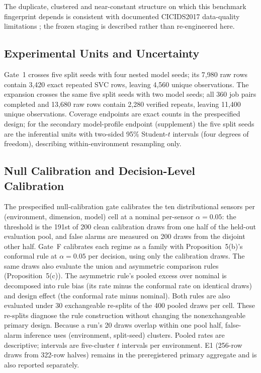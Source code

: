 \documentclass[10pt,journal,compsoc]{IEEEtran}
\begin{document}
The duplicate, clustered and near-constant structure on which this benchmark
fingerprint depends is consistent with documented CICIDS2017 data-quality
limitations \cite{Engelen2021}; the frozen staging is described rather than
re-engineered here.

\subsection{Experimental Units and Uncertainty}

Gate~1 crosses five split seeds with four nested model seeds; its 7,980 raw
rows contain 3,420 exact repeated SVC rows, leaving 4,560 unique observations.
The expansion crosses the same five split seeds with two model seeds; all 360
job pairs completed and 13,680 raw rows contain 2,280 verified repeats,
leaving 11,400 unique observations. Coverage endpoints are exact counts in the
prespecified design; for the secondary model-profile endpoint (supplement) the
five split seeds are the inferential units with two-sided 95\% Student-$t$
intervals (four degrees of freedom), describing within-environment resampling
only.

\subsection{Null Calibration and Decision-Level Calibration}

The prespecified null-calibration gate calibrates the ten distributional
sensors per (environment, dimension, model) cell at a nominal per-sensor
$\alpha=0.05$: the threshold is the 191st of 200 clean calibration draws from
one half of the held-out evaluation pool, and false alarms are measured on
200 draws from the disjoint other half. Gate~F calibrates each regime as a
family with Proposition~5(b)'s conformal rule at $\alpha=0.05$ per decision,
using only the calibration draws. The same draws also evaluate the union and
asymmetric comparison rules (Proposition~5(c)). The asymmetric rule's pooled excess
over nominal is decomposed into rule bias (its rate minus the conformal rate
on identical draws) and design effect (the conformal rate minus nominal).
Both rules are also evaluated under 30 exchangeable re-splits of the 400 pooled
draws per cell. These re-splits diagnose the rule construction without changing
the nonexchangeable primary design.
Because a run's 20 draws overlap within one pool half, false-alarm
inference uses (environment, split-seed) clusters. Pooled rates are descriptive;
intervals are five-cluster $t$ intervals per environment. E1 (256-row draws
from 322-row halves) remains in the preregistered primary aggregate and is also
reported separately.
\end{document}
